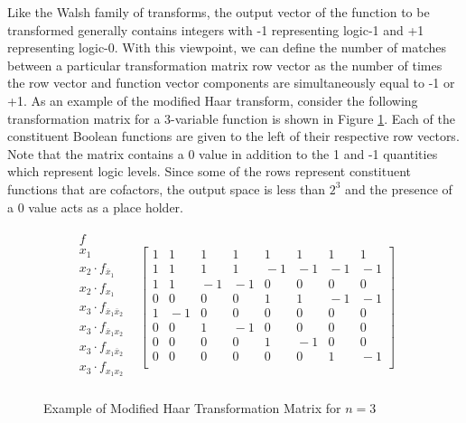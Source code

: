 Like the Walsh family of transforms, the output vector of the function to be transformed
generally contains integers with -1 representing logic-1 and +1 representing logic-0.
With this viewpoint, we can define the number of matches between a particular transformation
matrix row vector as the number of times the row vector and function vector components are simultaneously
equal to -1 or +1.  As an example of the modified Haar transform, consider the following 
transformation matrix for a 3-variable function is shown in Figure \ref{haar_mat}.  
Each of the constituent Boolean functions are
given to the left of their respective row vectors.  Note that the matrix contains a 0 value
in addition to the 1 and -1 quantities which represent logic levels.  Since some of the
rows represent constituent functions that are cofactors, the output space is less than $2^3$
and the presence of a 0 value acts as a place holder.

\begin{figure}
\begin{flushleft}
\[
\begin{array}{rl}
\begin{array}{r}
f \\
x_1 \\
x_2 \cdot f_{\overline{x}_1} \\
x_2 \cdot f_{x_1} \\
x_3 \cdot f_{\overline{x}_1 \overline{x}_2} \\
x_3 \cdot f_{\overline{x}_1 x_2} \\
x_3 \cdot f_{ x_1 \overline{x}_2} \\
x_3 \cdot f_{x_1 x_2} \\
\end{array} &
\! \! \! \! \! \! \! \! \! \left[ \! \!
\begin{array}{rrrrrrrr}
1 & \! 1 & \! 1 & \! 1 & \! 1 & \! 1 & \! 1 & \! 1 \\
1 & \! 1 & \! 1 & \! 1 & \! -1 & \! -1 & \! -1 & \! -1 \\
1 & \! 1 & \! -1 & \! -1 & \! 0 & \! 0 & \! 0 & \! 0 \\
0 & \! 0 & \! 0 & \! 0 & \! 1 & \! 1 & \! -1 & \! -1 \\
1 & \! -1 & \! 0 & \! 0 & \! 0 & \! 0 & \! 0 & \! 0 \\
0 & \! 0 & \! 1 & \! -1 & \! 0 & \! 0 & \! 0 & \! 0 \\
0 & \! 0 & \! 0 & \! 0 & \! 1 & \! -1 & \! 0 & \! 0 \\
0 & \! 0 & \! 0 & \! 0 & \! 0 & \! 0 & \! 1 & \! -1 \\
\end{array} \! \! \right]
\end{array} \]
\end{flushleft}
\caption{Example of Modified Haar Transformation Matrix for $n=3$} \label{haar_mat}
\end{figure}

